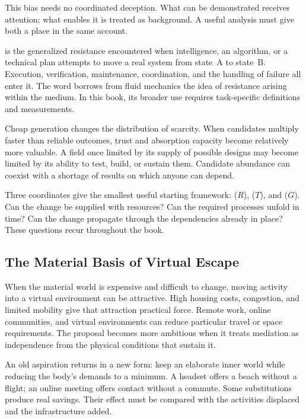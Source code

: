 This bias needs no coordinated deception. What can be demonstrated receives attention; what enables it is treated as background. A useful analysis must give both a place in the same account.


 is the generalized resistance encountered when intelligence, an algorithm, or a technical plan attempts to move a real system from state~A to state~B. Execution, verification, maintenance, coordination, and the handling of failure all enter it. The word borrows from fluid mechanics the idea of resistance arising within the medium. In this book, its broader use requires task-specific definitions and measurements.

Cheap generation changes the distribution of scarcity. When candidates multiply faster than reliable outcomes, trust and absorption capacity become relatively more valuable. A field once limited by its supply of possible designs may become limited by its ability to test, build, or sustain them. Candidate abundance can coexist with a shortage of results on which anyone can depend.

Three coordinates give the smallest useful starting framework:  ($R$),  ($T$), and  ($G$). Can the change be supplied with resources? Can the required processes unfold in time? Can the change propagate through the dependencies already in place? These questions recur throughout the book.

\subsection{The Material Basis of Virtual Escape}


When the material world is expensive and difficult to change, moving activity into a virtual environment can be attractive. High housing costs, congestion, and limited mobility give that attraction practical force. Remote work, online communities, and virtual environments can reduce particular travel or space requirements. The proposal becomes more ambitious when it treats mediation as independence from the physical conditions that sustain it.

An old aspiration returns in a new form: keep an elaborate inner world while reducing the body's demands to a minimum. A headset offers a beach without a flight; an online meeting offers contact without a commute. Some substitutions produce real savings. Their effect must be compared with the activities displaced and the infrastructure added.

